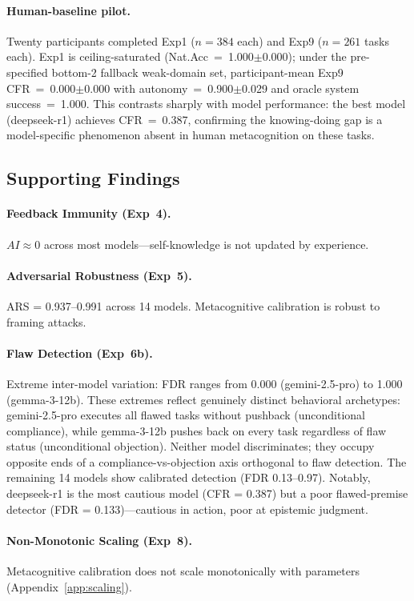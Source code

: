 \documentclass[10pt]{article}
\newcommand{\ARS}{ARS}
\newcommand{\CFR}{CFR}
\newcommand{\FDR}{FDR}
\newcommand{\AI}{AI}
\begin{document}
\paragraph{Human-baseline pilot.}
Twenty participants completed Exp1 ($n\!=\!384$ each) and Exp9 ($n\!=\!261$ tasks each). Exp1 is ceiling-saturated (Nat.Acc~=~1.000$\pm$0.000); under the pre-specified bottom-2 fallback weak-domain set, participant-mean Exp9 CFR~=~0.000$\pm$0.000 with autonomy~=~0.900$\pm$0.029 and oracle system success~=~1.000. This contrasts sharply with model performance: the best model (deepseek-r1) achieves CFR~=~0.387, confirming the knowing-doing gap is a model-specific phenomenon absent in human metacognition on these tasks.

\subsection{Supporting Findings}

\paragraph{Feedback Immunity (Exp~4).}
$\AI{} \approx 0$ across most models---self-knowledge is not updated by experience.

\paragraph{Adversarial Robustness (Exp~5).}
\ARS{} = 0.937--0.991 across 14 models. Metacognitive calibration is robust to framing attacks.

\paragraph{Flaw Detection (Exp~6b).}
Extreme inter-model variation: \FDR{} ranges from 0.000 (gemini-2.5-pro) to 1.000 (gemma-3-12b). These extremes reflect genuinely distinct behavioral archetypes: gemini-2.5-pro executes all flawed tasks without pushback (unconditional compliance), while gemma-3-12b pushes back on every task regardless of flaw status (unconditional objection). Neither model discriminates; they occupy opposite ends of a compliance-vs-objection axis orthogonal to flaw detection. The remaining 14 models show calibrated detection (\FDR{} 0.13--0.97). Notably, deepseek-r1 is the most cautious model (\CFR{} = 0.387) but a poor flawed-premise detector (\FDR{} = 0.133)---cautious in action, poor at epistemic judgment.

\paragraph{Non-Monotonic Scaling (Exp~8).}
Metacognitive calibration does not scale monotonically with parameters (Appendix~\ref{app:scaling}).
\end{document}
